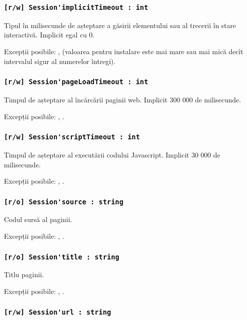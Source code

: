 \subsubsection{\lstinline|[r/w] Session'implicitTimeout : int|}

Tipul în milisecunde de așteptare a găsirii elementului sau al trecerii în stare interactivă. Implicit egal cu 0.

Excepții posibile: ,  (valoarea pentru instalare este mai mare sau mai mică decît intervalul sigur al numerelor întregi).

\subsubsection{\lstinline|[r/w] Session'pageLoadTimeout : int|}

Timpul de așteptare al încărcării paginii web. Implicit 300 000 de milisecunde.

Excepții posibile: , .

\subsubsection{\lstinline|[r/w] Session'scriptTimeout : int|}

Timpul de așteptare al executării codului Javascript. Implicit 30 000 de milisecunde.

Excepții posibile: , .

\subsubsection{\lstinline|[r/o] Session'source : string|}

Codul sursă al paginii.

Excepții posibile: , .

\subsubsection{\lstinline|[r/o] Session'title : string|}

Titlu paginii.

Excepții posibile: , .

\subsubsection{\lstinline|[r/w] Session'url : string|}

